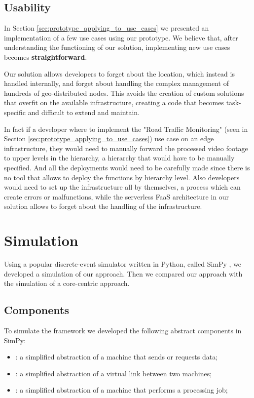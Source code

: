 \subsection{Usability}
In Section \ref{sec:prototype_applying_to_use_cases} we presented an implementation of a few use cases using our prototype. We believe that, after understanding the functioning of our solution, implementing new use cases becomes \textbf{straightforward}.

Our solution allows developers to forget about the location, which instead is handled internally, and forget about handling the complex management of hundreds of geo-distributed nodes.
This avoids the creation of custom solutions that overfit on the available infrastructure, creating a code that becomes task-specific and difficult to extend and maintain.

In fact if a developer where to implement the "Road Traffic Monitoring" (seen in Section \ref{sec:prototype_applying_to_use_cases}) use case on an edge infrastructure, they would need to manually forward the processed video footage to upper levels in the hierarchy, a hierarchy that would have to be manually specified. And all the deployments would need to be carefully made since there is no tool that allows to deploy the functions by hierarchy level.
Also developers would need to set up the infrastructure all by themselves, a process which can create errors or malfunctions, while the serverless FaaS architecture in our solution allows to forget about the handling of the infrastructure.


\section{Simulation}
Using a popular discrete-event simulator written in Python, called SimPy \cite{simpy}, we developed a simulation of our approach. Then we compared our approach with the simulation of a core-centric approach.


\subsection{Components}
To simulate the framework we developed the following abstract components in SimPy:
\begin{itemize}
    \item {}: a simplified abstraction of a machine that sends or requests data;
    \item {}: a simplified abstraction of a virtual link between two machines;
    \item {}: a simplified abstraction of a machine that performs a processing job;
\end{itemize}

